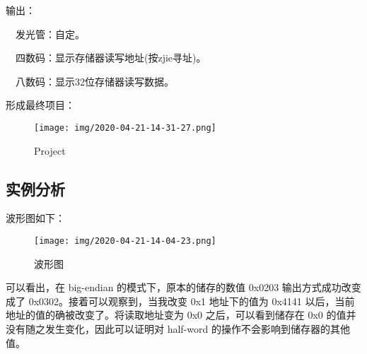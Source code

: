 \documentclass[UTF8]{ctexart}
\begin{document}
输出：

　发光管：自定。

　四数码：显示存储器读写地址(按zjie寻址)。

　八数码：显示32位存储器读写数据。

形成最终项目：

\begin{figure}
\centering
\texttt{[image: img/2020-04-21-14-31-27.png]}
\caption{Project}
\end{figure}

\hypertarget{ux5b9eux4f8bux5206ux6790}{%
\subsection{实例分析}\label{ux5b9eux4f8bux5206ux6790}}

波形图如下：

\begin{figure}
\centering
\texttt{[image: img/2020-04-21-14-04-23.png]}
\caption{波形图}
\end{figure}

可以看出，在 big-endian 的模式下，原本的储存的数值 0x0203
输出方式成功改变成了 0x0302。接着可以观察到，当我改变 0x1 地址下的值为
0x4141 以后，当前地址的值的确被改变了。将读取地址变为 0x0
之后，可以看到储存在 0x0 的值并没有随之发生变化，因此可以证明对
half-word 的操作不会影响到储存器的其他值。
\end{document}
